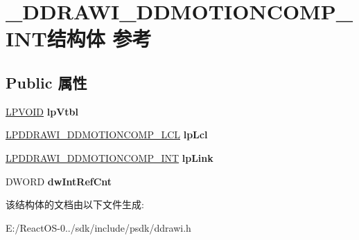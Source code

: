 \hypertarget{struct___d_d_r_a_w_i___d_d_m_o_t_i_o_n_c_o_m_p___i_n_t}{}\section{\+\_\+\+D\+D\+R\+A\+W\+I\+\_\+\+D\+D\+M\+O\+T\+I\+O\+N\+C\+O\+M\+P\+\_\+\+I\+N\+T结构体 参考}
\label{struct___d_d_r_a_w_i___d_d_m_o_t_i_o_n_c_o_m_p___i_n_t}
\subsection*{Public 属性}
\begin{DoxyCompactItemize}
\item 
\mbox{\label{struct___d_d_r_a_w_i___d_d_m_o_t_i_o_n_c_o_m_p___i_n_t_a920ddc82b8a76a2c9220cafa0de4604e}} 
\hyperlink{interfacevoid}{L\+P\+V\+O\+ID} {\bfseries lp\+Vtbl}
\item 
\mbox{\label{struct___d_d_r_a_w_i___d_d_m_o_t_i_o_n_c_o_m_p___i_n_t_ae6b1c1bac44e22b3b7e5b011df32e001}} 
\hyperlink{struct___d_d_r_a_w_i___d_d_m_o_t_i_o_n_c_o_m_p___l_c_l}{L\+P\+D\+D\+R\+A\+W\+I\+\_\+\+D\+D\+M\+O\+T\+I\+O\+N\+C\+O\+M\+P\+\_\+\+L\+CL} {\bfseries lp\+Lcl}
\item 
\mbox{\label{struct___d_d_r_a_w_i___d_d_m_o_t_i_o_n_c_o_m_p___i_n_t_aa0dd62320f1cfca108e5fb2cb74e230e}} 
\hyperlink{struct___d_d_r_a_w_i___d_d_m_o_t_i_o_n_c_o_m_p___i_n_t}{L\+P\+D\+D\+R\+A\+W\+I\+\_\+\+D\+D\+M\+O\+T\+I\+O\+N\+C\+O\+M\+P\+\_\+\+I\+NT} {\bfseries lp\+Link}
\item 
\mbox{\label{struct___d_d_r_a_w_i___d_d_m_o_t_i_o_n_c_o_m_p___i_n_t_a3855e117cfccd75e83fb3773e3c1d3ac}} 
D\+W\+O\+RD {\bfseries dw\+Int\+Ref\+Cnt}
\end{DoxyCompactItemize}


该结构体的文档由以下文件生成\+:\begin{DoxyCompactItemize}
\item 
E\+:/\+React\+O\+S-\/0../sdk/include/psdk/ddrawi.\+h\end{DoxyCompactItemize}
